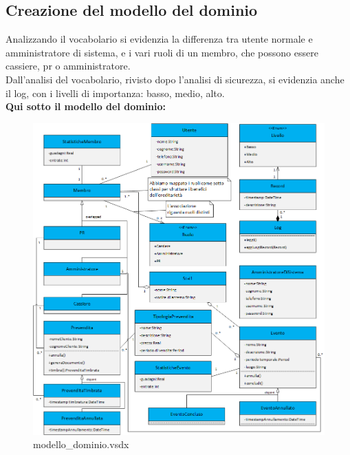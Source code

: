 \documentclass[a4paper]{article}
\begin{document}
\newpage

\subsection{Creazione del modello del dominio}

Analizzando il vocabolario si evidenzia la differenza tra utente normale e amministratore di sistema, e i vari ruoli di un membro, che possono essere cassiere, pr o amministratore.\\Dall'analisi del vocabolario, rivisto dopo l'analisi di sicurezza, si evidenzia anche il log, con i livelli di importanza: basso, medio, alto.\\\textbf{Qui sotto il modello del dominio:}\\




\begin{figure}[H]
    \includegraphics[scale=0.68]{Analisi/modello_dominio.png}
    \centering
    \caption{modello\_dominio.vsdx}
\end{figure}
\end{document}
